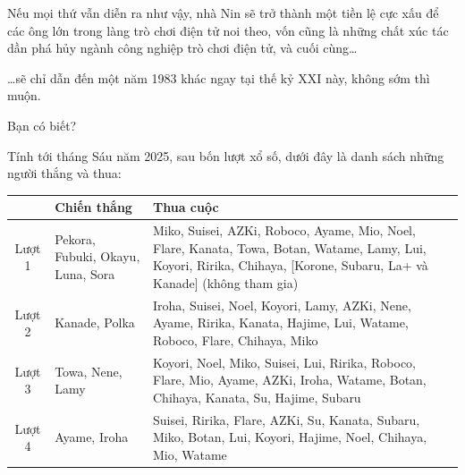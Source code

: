 \documentclass[../main.tex]{subfiles}
\begin{document}
Nếu mọi thứ vẫn diễn ra như vậy, nhà Nin sẽ trở thành một tiền lệ cực xấu để các ông lớn trong làng trò chơi điện tử noi theo, vốn cũng là những chất xúc tác dần phá hủy ngành công nghiệp trò chơi điện tử, và cuối cùng\dots

\dots sẽ chỉ dẫn đến một năm 1983 khác ngay tại thế kỷ XXI này, không sớm thì muộn.

\begin{center}{\abv\Large Bạn có biết?}\end{center}

Tính tới tháng Sáu năm 2025, sau bốn lượt xổ số, dưới đây là danh sách những người thắng và thua:

\begin{center}
    \begin{tabular}{|c|>{\raggedright\arraybackslash}p{}|>{\raggedright\arraybackslash}p{}|}
        \hline
               & Chiến thắng                       & Thua cuộc                                                                                                                                                              \\
        \hline
        Lượt 1 & Pekora, Fubuki, Okayu, Luna, Sora & Miko, Suisei, AZKi, Roboco, Ayame, Mio, Noel, Flare, Kanata, Towa, Botan, Watame, Lamy, Lui, Koyori, Ririka, Chihaya, [Korone, Subaru, La+ và Kanade] (không tham gia)
        \\
        \hline
        Lượt 2 & Kanade, Polka                     & Iroha, Suisei, Noel, Koyori, Lamy, AZKi, Nene, Ayame, Ririka, Kanata, Hajime, Lui, Watame, Roboco, Flare, Chihaya, Miko                                                \\
        \hline
        Lượt 3 & Towa, Nene, Lamy                  & Koyori, Noel, Miko, Suisei, Lui, Ririka, Roboco, Flare, Mio, Ayame, AZKi, Iroha, Watame, Botan, Chihaya, Kanata, Su, Hajime, Subaru                                    \\
        \hline
        Lượt 4 & Ayame, Iroha                      & Suisei, Ririka, Flare, AZKi, Su, Kanata, Subaru, Miko, Botan, Lui, Koyori, Hajime, Noel, Chihaya, Mio, Watame                                                          \\
        \hline
    \end{tabular}
\end{center}
\end{document}
